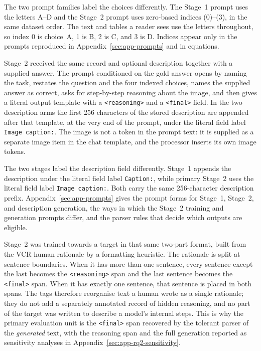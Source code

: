 The two prompt families label the choices differently. The Stage~1 prompt uses
the letters A--D and the Stage~2 prompt uses zero-based indices (0)--(3), in the
same dataset order. The text and tables a reader sees use the letters
throughout, so index 0 is choice~A, 1 is B, 2 is C, and 3 is D. Indices appear
only in the prompts reproduced in Appendix~\ref{sec:app-prompts} and in
equations.

Stage~2 received the same record and optional description together with a
supplied answer. The prompt conditioned on the gold answer opens by naming the
task, restates the question and the four indexed choices, names the supplied
answer as correct, asks for step-by-step reasoning about the image, and then
gives a literal output template with a \texttt{<reasoning>} and a
\texttt{<final>} field. In the two description arms the first 256 characters of
the stored description are appended after that template, at the very end of the
prompt, under the literal field label \texttt{Image caption:}. The
image is not a token in the prompt text: it is supplied as a separate image item
in the chat template, and the processor inserts its own image tokens.

The two stages label the description field differently. Stage~1 appends the
description under the literal field label \texttt{Caption:}, while primary
Stage~2 uses the literal field label \texttt{Image caption:}. Both carry the
same 256-character description prefix. Appendix~\ref{sec:app-prompts} gives the prompt forms for
Stage~1, Stage~2, and description generation, the ways in which the Stage~2
training and generation prompts differ, and the parser rules that decide which
outputs are eligible.

Stage~2 was trained towards a target in that same two-part format, built from
the VCR human rationale by a formatting heuristic. The rationale is split at
sentence boundaries. When it has more than one sentence, every sentence except
the last becomes the \texttt{<reasoning>} span and the last sentence becomes the
\texttt{<final>} span. When it has exactly one sentence, that sentence is placed
in both spans. The tags therefore reorganise text a human wrote as a single
rationale; they do not add a separately annotated record of hidden reasoning,
and no part of the target was written to describe a model's internal steps. This
is why the primary evaluation unit is the \texttt{<final>} span recovered by the
tolerant parser
of the \emph{generated} text, with the reasoning span and the full generation
reported as sensitivity analyses in
Appendix~\ref{sec:app-rq2-sensitivity}.

